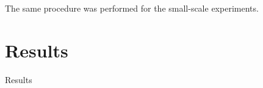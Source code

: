 \documentclass[11pt,a4paper]{article}
\begin{document}
    The same procedure was performed for the small-scale experiments.


\section{\label{sect:results}Results}

  \begin{table}[H]
    \center
    \caption{Results}
    \begin{tabular}{ r | l  l l  l  l  l }
      
    \end{tabular}
    \label{tab:results}
  \end{table}

  \begin{figure}[H]
    \center
    \\

\end{figure}
\end{document}
